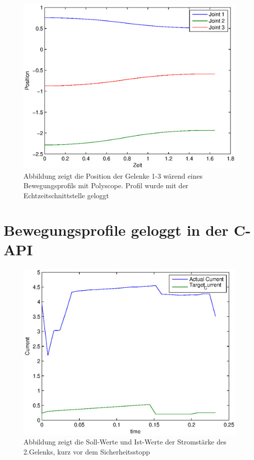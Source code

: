 \begin{figure}[H]
  \centering
    \includegraphics[width=1\textwidth]{pic/position_profile_polyscope.eps}
      \caption[Position wärend der Bewegung der Gelenke 1-3 mit Polyscope]{Abbildung zeigt die Position der Gelenke 1-3 wärend eines Bewegungsprofils mit Polyscope. Profil wurde mit der Echtzeitschnittstelle geloggt}
      \label{fig:position_joints_rci}
\end{figure}

\section{Bewegungsprofile geloggt in der C-\ac{API}}
\label{sec:profiles_with_capi}

\begin{figure}[H]
  \centering
    \includegraphics[width=1\textwidth]{pic/joint1_current_capi.eps}
      \caption[Soll und Ist-Werte der Stromstärke des 2.Gelenks]{Abbildung zeigt die Soll-Werte und Ist-Werte der Stromstärke des 2.Gelenks, kurz vor dem Sicherheitsstopp}
      \label{fig:joint_1_position_capi}
\end{figure}

